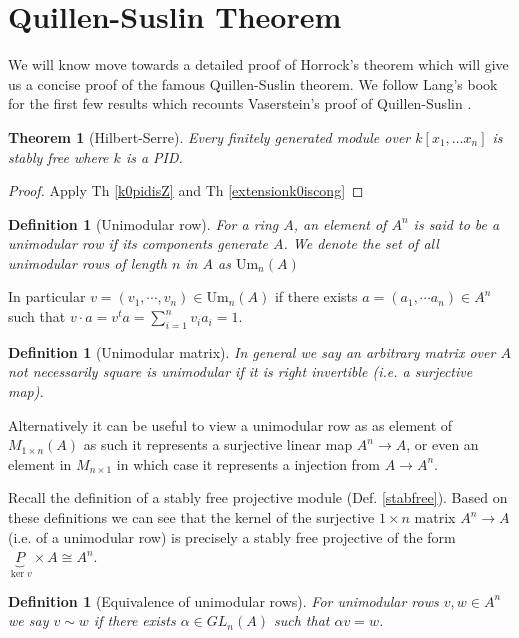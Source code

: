 \documentclass[12pt]{article}
\numberwithin{equation}{section}
\newcounter{dummy} \numberwithin{dummy}{section}
\newtheorem{theorem}[dummy]{Theorem}
\newtheorem{definition}[dummy]{Definition}
\newtheorem{lemma}[dummy]{Lemma}
\begin{document}
	
	
	\section{Quillen-Suslin Theorem}
	We will know move towards a detailed proof of Horrock's theorem which will give us a concise proof of the famous Quillen-Suslin theorem. We follow Lang's book for the first few results which recounts Vaserstein's proof of Quillen-Suslin \cite{lang02}.
	
	
	\begin{theorem}[Hilbert-Serre]
	Every finitely generated module over $k[x_1,\dots x_n]$ is stably free where $k$ is a PID.
	\end{theorem}
	\begin{proof}
		Apply Th \ref{k0pidisZ} and Th \ref{extensionk0iscong}
	\end{proof}
	
	
	\begin{definition}[Unimodular row]
		For a ring $A$, an element of $A^n$ is said to be a unimodular row if its components generate $A$. We denote the set of all unimodular rows of length $n$ in $A$ as $\mathrm{Um}_n(A)$
	\end{definition}
	In particular $v=(v_1, \cdots, v_n) \in \mathrm{Um}_n(A) $ if there exists $a=(a_1, \cdots a_n) \in A^n$ such that $ v \cdot a = v^t a = \sum_{i=1}^n v_i a_i = 1$.	
	\begin{definition}[Unimodular matrix]
		In general we say an arbitrary matrix over $A$ not necessarily square is unimodular if it is right invertible (i.e. a surjective map).
	\end{definition}
	Alternatively it can be useful to view a unimodular row as as element of $M_{1 \times n} (A) $ as such it represents a surjective linear map $A^n \to A$, or even an element in $M_{n \times 1}$ in which case it represents a injection from $A \to A^n$.
	
	Recall the definition of a stably free projective module (Def. \ref{stabfree}). Based on these definitions we can see that the kernel of the surjective $1 \times n $ matrix $A^n \to A$ (i.e. of a unimodular row) is precisely a stably free projective of the form $\underbrace{P}_{\ker v} \times A \cong A^n$.
	
	
	
	\begin{definition}[Equivalence of unimodular rows]
		For unimodular rows $v,w\in A^n$ we say $v \sim w $ if there exists $ \alpha \in GL_n(A)$ such that $\alpha v=w$.
	\end{definition}
	
\end{document}
